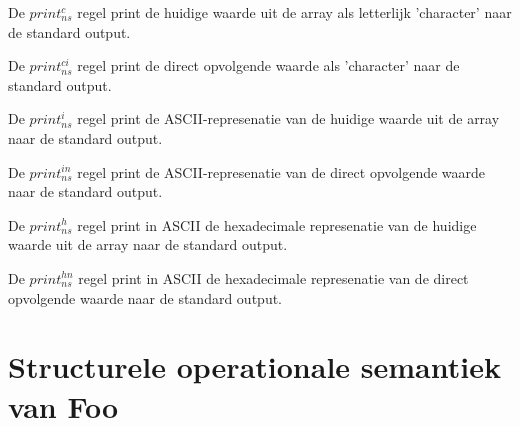 \documentclass[11pt]{article}
\begin{document}
De $print^c_{ns}$ regel print de huidige waarde uit de array als letterlijk 'character' naar de standard output.
\begin{prooftree}
\end{prooftree}

De $print^{ci}_{ns}$ regel print de direct opvolgende waarde als 'character' naar de standard output.
\begin{prooftree}
\end{prooftree}

De $print^i_{ns}$ regel print de ASCII-represenatie van de huidige waarde uit de array naar de standard output.
\begin{prooftree}
\end{prooftree}

De $print^{in}_{ns}$ regel print de ASCII-represenatie van de direct opvolgende waarde naar de standard output.
\begin{prooftree}
\end{prooftree}

De $print^h_{ns}$ regel print in ASCII de hexadecimale represenatie van de huidige waarde uit de array naar de standard output.
\begin{prooftree}
\end{prooftree}

De $print^{hn}_{ns}$ regel print in ASCII de hexadecimale represenatie van de direct opvolgende waarde naar de standard output.
\begin{prooftree}
\end{prooftree}



\section{Structurele operationale semantiek van Foo}

%
\end{document}
